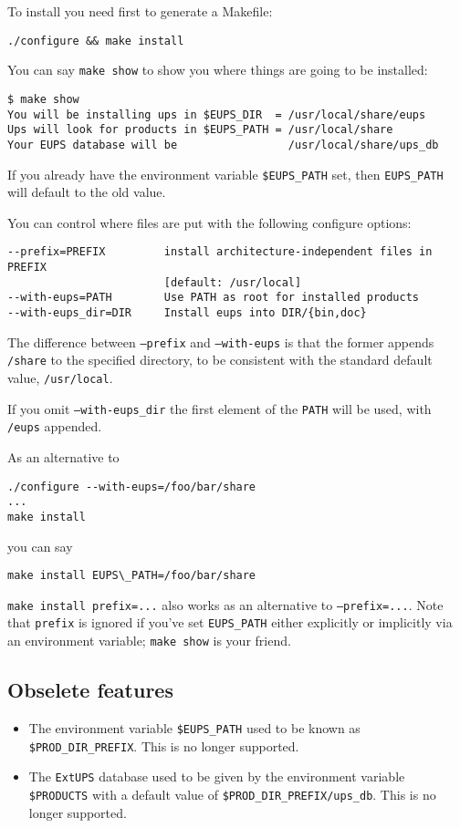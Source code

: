 \documentclass{article}
\newcommand{\code}[1]{\texttt{#1}}
\newcommand{\eups}{\code{ExtUPS}}
\begin{document}
  To install you need first to generate a Makefile:
\begin{verbatim}
./configure && make install
\end{verbatim}

You can say \code{make show} to show you where things are
going to be installed:
\begin{verbatim}
$ make show
You will be installing ups in $EUPS_DIR  = /usr/local/share/eups
Ups will look for products in $EUPS_PATH = /usr/local/share
Your EUPS database will be                 /usr/local/share/ups_db
\end{verbatim} %
If you already have the environment variable \code{\$EUPS\_PATH} set,
then \code{EUPS\_PATH} will default to the old value.

You can control where files are put with the following configure options:
\begin{verbatim}
--prefix=PREFIX         install architecture-independent files in PREFIX
                        [default: /usr/local]
--with-eups=PATH        Use PATH as root for installed products
--with-eups_dir=DIR     Install eups into DIR/{bin,doc}
\end{verbatim}
The difference between \code{--prefix} and \code{--with-eups}
is that the former appends \code{/share} to the specified directory, to
be consistent with the standard default value, \code{/usr/local}.

If you omit \code{--with-eups\_dir} the first element of the \code{PATH}
will be used, with \code{/eups} appended.
  
As an alternative to
\begin{verbatim}
./configure --with-eups=/foo/bar/share
...
make install
\end{verbatim}
you can say
\begin{verbatim}
make install EUPS\_PATH=/foo/bar/share
\end{verbatim}
\code{make install prefix=...} also works as an alternative to \code{--prefix=...}.
Note that \code{prefix} is ignored if you've set \code{EUPS\_PATH} either explicitly
or implicitly via an environment variable; \code{make show} is your friend.

\subsection{Obselete features}

\begin{itemize}
  \item The environment variable \code{\$EUPS\_PATH} used to be known
  as \code{\$PROD\_DIR\_PREFIX}. This is no longer supported.

  \item The \eups{} database used to be given by the environment variable \code{\$PRODUCTS}
    with a default value of \code{\$PROD\_DIR\_PREFIX/ups\_db}. This is no longer supported.
\end{itemize}
\end{document}
